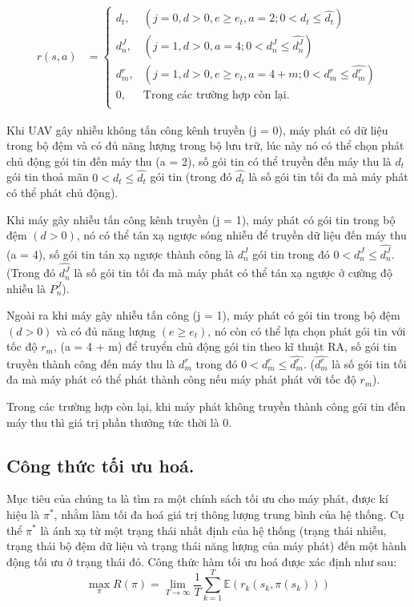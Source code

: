 \documentclass{uetgraduation}
\begin{document}
\begin{align*}
    r(s,a) &= \begin{cases}
        d_t, & (j = 0, d > 0, e \geq e_t, a = 2; 0 < d_t \leq \hat{d_t}) \\
        d_n^J, & (j = 1, d > 0, a = 4; 0 < d_n^J \leq \hat{d_n^J}) \\
        d_m^r, & (j = 1, d > 0, e \geq e_t, a = 4 + m; 0 < d_m^r \leq \hat{d_m^r}) \\
        0, & \text{Trong các trường hợp còn lại.} \\
    \end{cases}
\end{align*}

Khi UAV gây nhiễu không tấn công kênh truyền (j = 0), máy phát có dữ liệu trong bộ đệm và có đủ năng lượng trong bộ lưu trữ, lúc này nó có thể chọn phát
chủ động gói tin đến máy thu (a = 2), số gói tin có thể truyền đến máy thu là $d_t$ gói tin thoả mãn $0 < d_t \leq \hat{d_t}$ gói tin (trong đó $\hat{d_t}$
là số gói tin tối đa mà máy phát có thể phát chủ động).

Khi máy gây nhiễu tấn công kênh truyền (j = 1), máy phát có gói tin trong bộ đệm $(d > 0)$, nó có thể tán xạ ngược sóng nhiễu để truyền dữ liệu đến máy thu (a = 4), 
số gói tin tán xạ ngược thành công là $d_n^J$ gói tin trong đó $0 < d_n^J \leq \hat{d_n^J}$. (Trong đó $\hat{d_n^J}$ là số gói tin tối đa mà máy phát có thể tán xạ ngược
ở cường độ nhiễu là $P_n^J$).

Ngoài ra khi máy gây nhiễu tấn công (j = 1), máy phát có gói tin trong bộ đệm $(d > 0)$ và có đủ năng lượng $(e \geq e_t)$, nó còn có thể lựa chọn phát gói 
tin với tốc độ $r_m$, (a = 4 + m) để truyển chủ động gói tin theo kĩ thuật RA, số gói tin truyền thành công đến máy thu là $d_m^r$ trong đó $0 < d_m^r \leq \hat{d_m^r}$.
($\hat{d_m^r}$ là số gói tin tối đa mà máy phát có thể phát thành công nếu máy phát phát với tốc độ $r_m$).

Trong các trường hợp còn lại, khi máy phát không truyền thành công gói tin đến máy thu thì giá trị phần thưởng tức thời là 0.


\subsection{Công thức tối ưu hoá.}
Mục tiêu của chúng ta là tìm ra một chính sách tối ưu cho máy phát, được kí hiệu là $\pi^*$, nhằm làm tối đa hoá giá trị thông lượng trung bình
của hệ thống. Cụ thể $\pi^*$ là ánh xạ từ một trạng thái nhất định của hệ thống (trạng thái nhiễu, trạng thái bộ đệm dữ liệu và trạng thái năng
lượng của máy phát) đến một hành động tối ưu ở trạng thái đó.
Công thức hàm tối ưu hoá được xác định như sau:
\[
\max_{\pi} R(\pi) = \lim_{T \to \infty} \frac{1}{T} \sum_{k=1}^{T} \mathbb{E}\left( r_k(s_k, \pi(s_k)) \right)
\]
\end{document}

